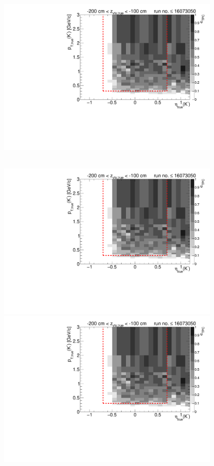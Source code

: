 \begin{figure}[hb]
{  \includegraphics[width=\linewidth,page=17]{graphics/eff/Eff2D_TPC_kaon_Minus_RunRange1.pdf}
}~
\parbox{0.495\textwidth}{
  \centering
  \includegraphics[width=\linewidth,page=12]{graphics/eff/Eff2D_TPC_kaon_Minus_RunRange1.pdf}\\
  \includegraphics[width=\linewidth,page=14]{graphics/eff/Eff2D_TPC_kaon_Minus_RunRange1.pdf}\\
}
\end{figure}
